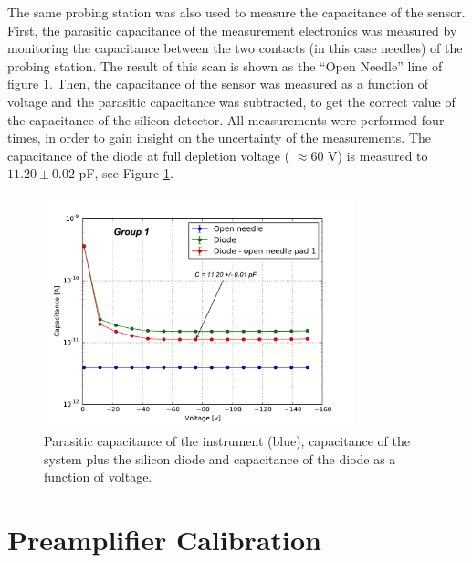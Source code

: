 \documentclass[12pt]{article}
\begin{document}
The same probing station was also used to measure the capacitance of the sensor. First, the parasitic capacitance of the measurement electronics was measured by monitoring the capacitance between the two contacts (in this case needles) of the probing station. The result of this scan is shown as the ``Open Needle'' line of figure \ref{fig:VC_curve_single}. Then, the capacitance of the sensor was measured as a function of voltage and the parasitic capacitance was subtracted, to get the correct value of the capacitance of the silicon detector. All measurements were performed four times, in order to gain insight on the uncertainty of the measurements. The capacitance of the diode at full depletion voltage ( $\approx 60$ V) is measured to $11.20 \pm 0.02$ pF, see Figure \ref{fig:VC_curve_single}.


\begin{figure}[H]
  \centering
  \includegraphics[width=0.8\textwidth]{./graphics/V_vs_C}
  \caption{Parasitic capacitance of the instrument (blue), capacitance of the system plus the silicon diode and capacitance of the diode as a function of voltage.}
  \label{fig:VC_curve_single}
\end{figure}



\section{Preamplifier Calibration}
\end{document}
